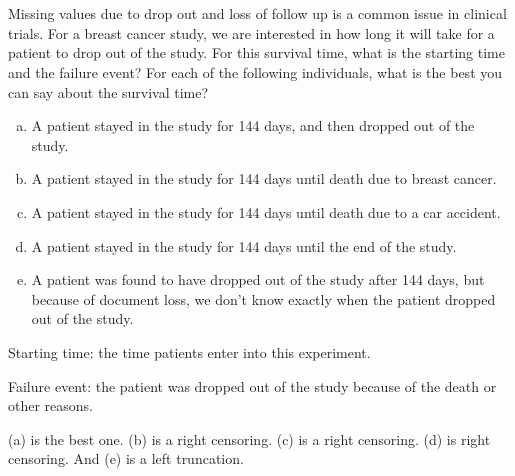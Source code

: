 \documentclass[12pt]{elegantbook}
\begin{document}

\chapter{}

    \begin{exercise}
        Missing values due to drop out and loss of follow up is a common issue in clinical trials. For a breast cancer study, we are interested in how long it will take for a patient to drop out of the study. For this survival time, what is the starting time and the failure event? For each of the following individuals, what is the best you can say about the survival time?
        \begin{enumerate}[(a)]
            \item A patient stayed in the study for 144 days, and then dropped out of the study.
            \item A patient stayed in the study for 144 days until death due to breast cancer.
            \item A patient stayed in the study for 144 days until death due to a car accident.
            \item A patient stayed in the study for 144 days until the end of the study.
            \item A patient was found to have dropped out of the study after 144 days, but because of document loss, we don't know exactly when the patient dropped out of the study. 
        \end{enumerate}
    \end{exercise}

    \begin{solution}

        Starting time: the time patients enter into this experiment. 

        Failure event: the patient was dropped out of the study because of the death or other reasons. 

        (a) is the best one. (b) is a right censoring. (c) is a right censoring. (d) is right censoring. And (e) is a left truncation. 
    \end{solution}
\end{document}
